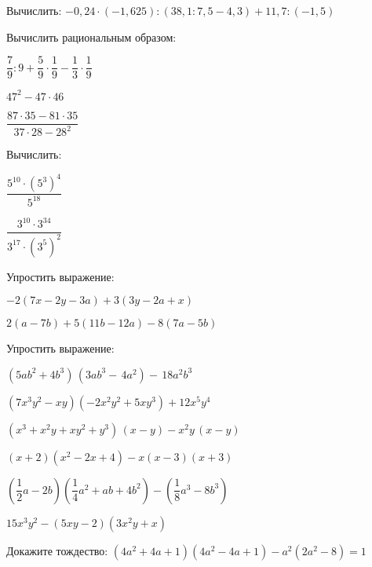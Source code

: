 \begin{listofex}
	\item Вычислить: \( -0,24\cdot(-1,625):(38,1:7,5-4,3)+11,7:(-1,5) \)
	\item Вычислить рациональным образом:
	\begin{enumcols}[itemcolumns=3]
		\item \( \dfrac{7}{9}:9+\dfrac{5}{9}\cdot\dfrac{1}{9}-\dfrac{1}{3}\cdot\dfrac{1}{9} \)
		\item \( 47^2-47\cdot46 \)
		\item \( \dfrac{87\cdot35-81\cdot35}{37\cdot28-28^2} \)
	\end{enumcols}
	\item Вычислить:
	\begin{enumcols}[itemcolumns=2]
		\item \( \dfrac{5^{10}\cdot(5^3)^4}{5^{18}} \)
		\item \( \dfrac{3^{10}\cdot3^{34}}{3^{17}\cdot{(3^5)^2}} \)
	\end{enumcols}
	\item Упростить выражение:
	\begin{enumcols}[itemcolumns=2]
		\item \( -2(7x-2y-3a)+3(3y-2a+x) \)
		\item \( 2(a-7b)+5(11b-12a)-8(7a-5b) \)
	\end{enumcols}
	\item Упростить выражение:
	\begin{enumcols}[itemcolumns=2]
		\item \( (5a b^{2}+4b^{3})\,(3a b^{3}-\,4a^{2})-\,18a^{2}b^{3} \)
		\item \( (7x^{3}y^{2}-x y)(-2x^{2}y^{2}+5x y^{3})+12x^{5}y^{4} \)
		\item \( (x^{3}+x^{2}y+x y^{2}+y^{3})\,(x-y)-x^{2}y\,(x-y) \)
		\item \( (x+2)(x^{2}-2x+4)-x(x-3)(x+3) \)
		\item \( \left( \dfrac{1}{2}a-2b \right)\left( \dfrac{1}{4}a^2+ab+4b^2 \right)-\left( \dfrac{1}{8}a^3-8b^3 \right) \)
		\item \( 15x^3y^2-(5xy-2)(3x^2y+x) \)
	\end{enumcols}
	\item Докажите тождество: \( (4a^2+4a+1)(4a^2-4a+1)-a^2(2a^2-8)=1 \)
\end{listofex}

